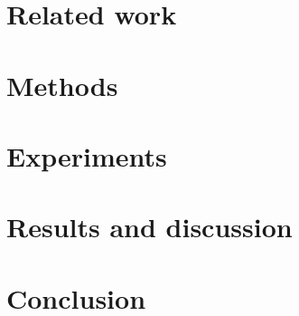 \documentclass[a4paper]{article}
\begin{document}
\section{Related work}
\section{Methods}
\section{Experiments}
\section{Results and discussion}
\section{Conclusion}




\end{document}
